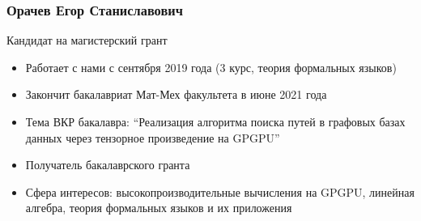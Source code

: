 \documentclass[xcolor=table,aspectratio=169]{beamer}
\begin{document}
\begin{frame}[fragile] \frametitle{Орачев Егор Станиславович}
      \begin{minipage}[m]{0.45\linewidth}
  \end{minipage}\hfill
  \begin{minipage}[m]{0.54\linewidth}
  Кандидат на магистерский грант

  \vfill

  \begin{itemize}
        \item Работает с нами с сентября 2019 года (3 курс, теория формальных языков)
        \item Закончит бакалавриат Мат-Мех факультета в июне 2021 года
        \item Тема ВКР бакалавра: ``Реализация алгоритма поиска путей в графовых базах данных через тензорное произведение на GPGPU''
        \item Получатель бакалаврского гранта
        \item Сфера интересов: высокопроизводительные вычисления на GPGPU, линейная алгебра, теория формальных языков и их приложения
  \end{itemize}
  \end{minipage}

\end{frame}
\end{document}
